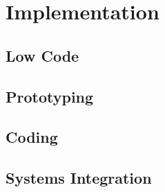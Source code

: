 %
%
\chapter{Implementation}

\section{Low Code}

\section{Prototyping}

\section{Coding}

\section{Systems Integration}

\clearpage